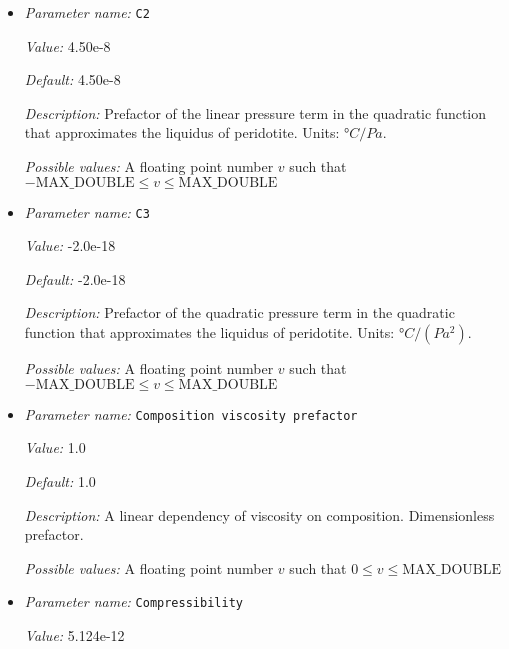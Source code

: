 \begin{itemize}
{\it Possible values:} A floating point number $v$ such that $-\text{MAX\_DOUBLE} \leq v \leq \text{MAX\_DOUBLE}$
\item {\it Parameter name:} {\tt C2}
\label{parameters:Material model/Latent heat melt/C2}


{\it Value:} 4.50e-8


{\it Default:} 4.50e-8


{\it Description:} Prefactor of the linear pressure term in the quadratic function that approximates the liquidus of peridotite. Units: $°C/Pa$.


{\it Possible values:} A floating point number $v$ such that $-\text{MAX\_DOUBLE} \leq v \leq \text{MAX\_DOUBLE}$
\item {\it Parameter name:} {\tt C3}
\label{parameters:Material model/Latent heat melt/C3}


{\it Value:} -2.0e-18


{\it Default:} -2.0e-18


{\it Description:} Prefactor of the quadratic pressure term in the quadratic function that approximates the liquidus of peridotite. Units: $°C/(Pa^2)$.


{\it Possible values:} A floating point number $v$ such that $-\text{MAX\_DOUBLE} \leq v \leq \text{MAX\_DOUBLE}$
\item {\it Parameter name:} {\tt Composition viscosity prefactor}
\label{parameters:Material model/Latent heat melt/Composition viscosity prefactor}


{\it Value:} 1.0


{\it Default:} 1.0


{\it Description:} A linear dependency of viscosity on composition. Dimensionless prefactor.


{\it Possible values:} A floating point number $v$ such that $0 \leq v \leq \text{MAX\_DOUBLE}$
\item {\it Parameter name:} {\tt Compressibility}
\label{parameters:Material model/Latent heat melt/Compressibility}


{\it Value:} 5.124e-12



\end{itemize}
